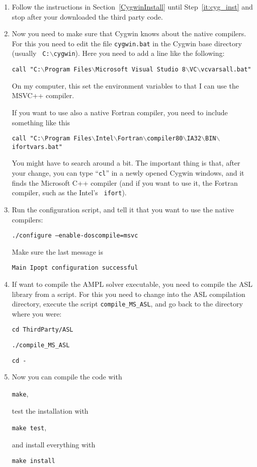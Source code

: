\documentclass[10pt]{article}
\begin{document}
\begin{enumerate}
\item Follow the instructions in Section~\ref{CygwinInstall} until
  Step~\ref{it:cyg_inst} and stop after your downloaded the third
  party code.

\item\label{it:setupmsvcpath} Now you need to make sure that Cygwin
  knows about the native compilers.  For this you need to edit the
  file {\tt cygwin.bat} in the Cygwin base directory (usually {\tt
    C:$\backslash$cygwin}).  Here you need to add a line like the
  following:

  \texttt{call "C:$\backslash$Program Files$\backslash$Microsoft Visual
    Studio 8$\backslash$VC$\backslash$vcvarsall.bat"}

  On my computer, this set the environment variables to that I can use
  the MSVC++ compiler.

  If you want to use also a native Fortran compiler, you need to
  include something like this

  \texttt{call "C:$\backslash$Program
    Files$\backslash$Intel$\backslash$Fortran$\backslash$compiler80$\backslash$IA32$\backslash$BIN$\backslash$ifortvars.bat"}

  You might have to search around a bit.  The important thing is that,
  after your change, you can type ``{\tt cl}'' in a newly opened
  Cygwin windows, and it finds the Microsoft C++ compiler (and if you
  want to use it, the Fortran compiler, such as the Intel's {\tt
    ifort}).

\item Run the configuration script, and tell it that you want to use
  the native compilers:

  \texttt{./configure --enable-doscompile=msvc}

  Make sure the last message is

  \texttt{Main Ipopt configuration successful}

\item\label{it:ASLcompile} If want to compile the AMPL solver
  executable, you need to compile the ASL library from a script.  For
  this you need to change into the ASL compilation directory, execute
  the script \texttt{compile\_MS\_ASL}, and go back to the directory
  where you were:

  \texttt{cd ThirdParty/ASL}

  \texttt{./compile\_MS\_ASL}

  \texttt{cd -}

\item Now you can compile the code with

  \texttt{make},

  test the installation with

  \texttt{make test},

  and install everything with

  \texttt{make install}
\end{enumerate}
\end{document}
